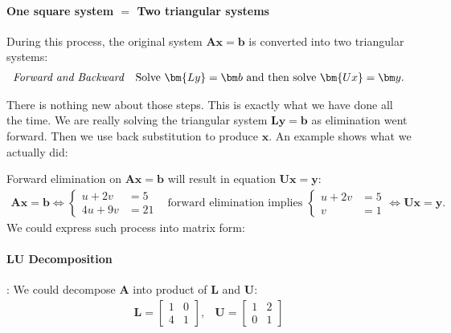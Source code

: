\begin{enumerate}
\begin{remark}
\paragraph{One square system $=$ Two triangular systems}
During this process, the original system $\bm{Ax}=\bm b$ is converted into two triangular systems:
\[
\begin{array}{ll}
\mbox{\emph{Forward and Backward}}
&
\mbox{Solve $\bm{Ly}=\bm b$ and then solve $\bm{Ux}=\bm y$.}
\end{array}
\]
\end{remark}
There is nothing new about those steps. This is exactly what we have done all the time. We are really solving the triangular system $\bm{Ly}=\bm b$ as elimination went forward. Then we use back substitution to produce $\bm x$. An example shows what we actually
did:
\begin{example}
Forward elimination on $\bm{Ax}=\bm b$ will result in equation $\bm{Ux}=\bm y$:
\[
\begin{array}{ll}
\bm{Ax}=\bm b\Longleftrightarrow
\left\{
\begin{aligned}
u+2v&=5\\4u+9v&=21
\end{aligned}
\right.
&
\mbox{forward elimination implies }
\left\{
\begin{aligned}
u+2v&=5\\v&=1
\end{aligned}
\right.
\Longleftrightarrow
\bm{Ux}=\bm y.
\end{array}
\]
We could express such process into matrix form:
\paragraph{LU Decomposition}: We could decompose $\bm A$ into product of $\bm L$ and $\bm U$:
\[
\begin{array}{ll}
\bm L=\begin{bmatrix}
1&0\\4&1
\end{bmatrix},
&
\bm U=\begin{bmatrix}
1&2\\0&1
\end{bmatrix}
\end{array}
\]

\end{example}
\end{enumerate}
